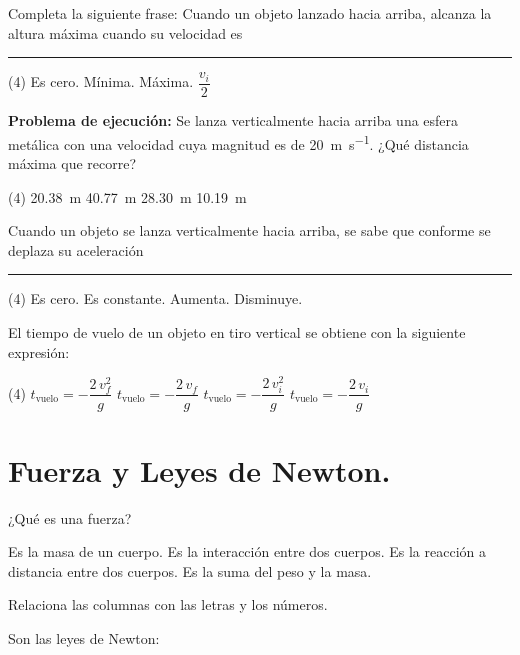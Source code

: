 \documentclass[12pt, letter]{exam}
\begin{document}
\begin{questions}
    \question Completa la siguiente frase: Cuando un objeto lanzado hacia arriba, alcanza la altura máxima cuando su velocidad es \rule{2cm}{0.3mm}
    \begin{tasks}(4)
        \task Es cero.
        \task Mínima.
        \task Máxima.
        \task $\dfrac{v_{i}}{2}$
    \end{tasks}
    \question \label{Problema_03} \textbf{Problema de ejecución: }Se lanza verticalmente hacia arriba una esfera metálica con una velocidad cuya magnitud es de \SI{20}{\meter\per\second}. ¿Qué distancia máxima que recorre?
    \begin{tasks}(4)
        \task \SI{20.38}{\meter}
        \task \SI{40.77}{\meter}
        \task \SI{28.30}{\meter}
        \task \SI{10.19}{\meter}
    \end{tasks}
    \question Cuando un objeto se lanza verticalmente hacia arriba, se sabe que conforme se deplaza su aceleración \rule{2cm}{0.3mm}
    \begin{tasks}(4)
        \task Es cero.
        \task Es constante.
        \task Aumenta.
        \task Disminuye.
    \end{tasks}
    \question El tiempo de vuelo de un objeto en tiro vertical se obtiene con la siguiente expresión:
    \begin{tasks}(4)
        \task $t_{\text{vuelo}} = - \dfrac{2 \, v_{f}^{2}}{g}$
        \task $t_{\text{vuelo}} = - \dfrac{2 \, v_{f}}{g}$
        \task $t_{\text{vuelo}} = - \dfrac{2 \, v_{i}^{2}}{g}$
        \task $t_{\text{vuelo}} = - \dfrac{2 \, v_{i}}{g}$
    \end{tasks}
    

    \section{Fuerza y Leyes de Newton.}

    \question ¿Qué es una fuerza?
    \begin{tasks}
        \task Es la masa de un cuerpo.
        \task Es la interacción entre dos cuerpos.
        \task Es la reacción a distancia entre dos cuerpos.
        \task Es la suma del peso y la masa.
    \end{tasks}
    \question Relaciona las columnas con las letras y los números.
    
    Son las leyes de Newton:
    
    \begin{minipage}[t]{0.4\linewidth}
    \begin{parts}

\end{parts}
\end{minipage}
\end{questions}
\end{document}
